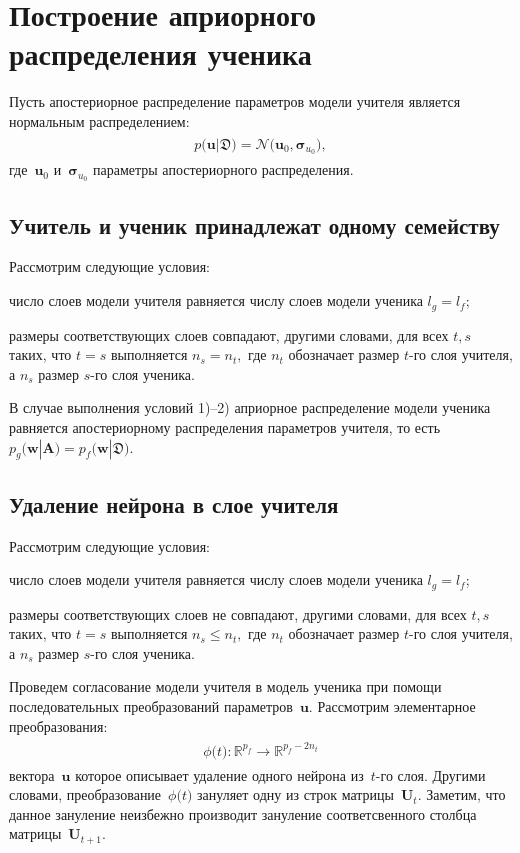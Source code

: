 \documentclass[12pt]{a&t}
\begin{document}
\section{Построение априорного распределения ученика}
Пусть апостериорное распределение параметров модели учителя является нормальным распределением:
\begin{gather}
\label{eq:ap:1}
\begin{aligned}
p\bigr(\mathbf{u}|\mathfrak{D}\bigr) = \mathcal{N}\bigr(\mathbf{u}_0, \bm{\bm{\sigma}}_{u_0}\bigr),
\end{aligned}
\end{gather}
где~$\mathbf{u}_0$ и~$\bm{\bm{\sigma}}_{u_0}$ параметры апостериорного распределения.

\subsection{Учитель и ученик принадлежат одному семейству}
Рассмотрим следующие условия:
\begin{enumlist}
    \item число слоев модели учителя равняется числу слоев модели ученика ${l_g}={l_f}$;
    \item размеры соответствующих слоев совпадают, другими словами, для всех $t, s$ таких, что $t=s$ выполняется $n_s = n_t,$ где $n_t$ обозначает размер $t$-го слоя учителя, а $n_s$ размер $s$-го слоя ученика.
\end{enumlist}
В случае выполнения условий 1)--2) априорное распределение модели ученика равняется апостериорному распределения параметров учителя, то есть $p_g\bigr(\mathbf{w}|\mathbf{A}\bigr) = p_f\bigr(\mathbf{w}|\mathfrak{D}\bigr)$.

\subsection{Удаление нейрона в слое учителя}
Рассмотрим следующие условия:
\begin{enumlist}
    \item число слоев модели учителя равняется числу слоев модели ученика ${l_g}={l_f}$;
    \item размеры соответствующих слоев не совпадают, другими словами, для всех $t, s$ таких, что $t=s$ выполняется $n_s \leq n_t,$ где $n_t$ обозначает размер $t$-го слоя учителя, а $n_s$ размер $s$-го слоя ученика.
\end{enumlist}

Проведем согласование модели учителя в модель ученика при помощи последовательных преобразований параметров~$\mathbf{u}$. Рассмотрим элементарное преобразования:
\begin{gather}
\label{eq:ap:2}
\begin{aligned}
\phi\bigr(t\bigr) : \mathbb{R}^{p_f} \to \mathbb{R}^{p_f-2n_t}
\end{aligned}
\end{gather}
вектора~$\mathbf{u}$ которое описывает удаление одного нейрона из~$t$-го слоя. Другими словами, преобразование~$\phi\bigr(t\bigr)$ зануляет одну из строк матрицы~$\mathbf{U}_t$. Заметим, что данное зануление неизбежно производит зануление соответсвенного столбца матрицы~$\mathbf{U}_{t+1}$.
\end{document}
